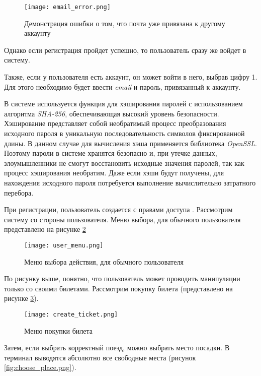 \begin{figure}[h]
    \centering
    \texttt{[image: email\_error.png]}
    \caption{Демонстрация ошибки о том, что почта уже привязана к другому аккаунту}
    \label{fig:email_error.png}
\end{figure}

Однако если регистрация пройдет успешно, то пользователь сразу же войдет в систему.

Также, если у пользователя есть аккаунт, он может войти в него, выбрав цифру 1. Для этого необходимо будет ввести \textit{email} и пароль, привязанный к аккаунту. 

В системе используется функция для хэширования паролей с использованием алгоритма \textit{SHA-256}, обеспечивающая высокий уровень безопасности. Хэширование представляет собой необратимый процесс преобразования исходного пароля в уникальную последовательность символов фиксированной длины. В данном случае для вычисления хэша применяется библиотека \textit{OpenSSL}. Поэтому пароли в системе хранятся безопасно и, при утечке данных, злоумышленники не смогут восстановить исходные значения паролей, так как процесс хэширования необратим. Даже если хэши будут получены, для нахождения исходного пароля потребуется выполнение вычислительно затратного перебора.

При регистрации, пользователь создается с правами доступа . Рассмотрим систему со стороны пользователя. Меню выбора, для обычного пользователя представлено на рисунке \ref{fig:user_menu.png}

\begin{figure}[h]
    \centering
    \texttt{[image: user\_menu.png]}
    \caption{Меню выбора действия, для обычного пользователя}
    \label{fig:user_menu.png}
\end{figure}

По рисунку выше, понятно, что пользователь может проводить манипуляции только со своими билетами. Рассмотрим покупку билета (представлено на рисунке \ref{fig:create_ticket.png}).

\begin{figure}[h]
    \centering
    \texttt{[image: create\_ticket.png]}
    \caption{Меню покупки билета}
    \label{fig:create_ticket.png}
\end{figure}

Затем, если выбрать корректный поезд, можно выбрать место посадки. В терминал выводятся абсолютно все свободные места (рисунок \ref{fig:choose_place.png}).

